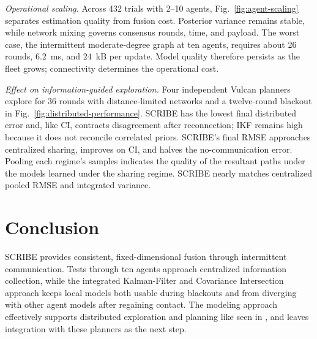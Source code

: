 \documentclass[letterpaper,10pt,conference]{ieeeconf}
\begin{document}
\noindent\textit{Operational scaling.}
Across 432 trials with 2--10 agents, Fig.~\ref{fig:agent-scaling} separates
estimation quality from fusion cost. Posterior variance remains stable, while
network mixing governs consensus rounds, time, and payload. The worst case,
the intermittent moderate-degree graph at ten agents, requires about 26
rounds, $6.2$~ms, and $24$~kB per update. Model quality therefore persists as
the fleet grows; connectivity determines the operational cost.

\noindent\textit{Effect on information-guided exploration.}
Four independent Vulcan planners \cite{ayton2018vulcan} explore for 36 rounds
with distance-limited networks and a twelve-round blackout in
Fig.~\ref{fig:distributed-performance}. SCRIBE has the lowest final distributed
error and, like CI, contracts disagreement after reconnection; IKF remains high
because it does not reconcile correlated priors. SCRIBE's final RMSE
approaches centralized sharing, improves
on CI, and halves the no-communication error. Pooling each regime's samples indicates the quality of the resultant paths under the models learned under the sharing regime. SCRIBE nearly matches centralized pooled RMSE and integrated variance.

\section{Conclusion}

SCRIBE provides consistent, fixed-dimensional fusion through intermittent
communication. Tests through ten agents approach centralized information
collection, while the integrated Kalman-Filter and Covariance Intersection approach keeps local models both usable during blackouts and from diverging with other agent models after regaining contact.
The modeling approach effectively supports distributed exploration and planning like seen in \cite{jang2021fully, olkin2024multi}, and leaves integration with these planners as the next step.

\balance


\end{document}
